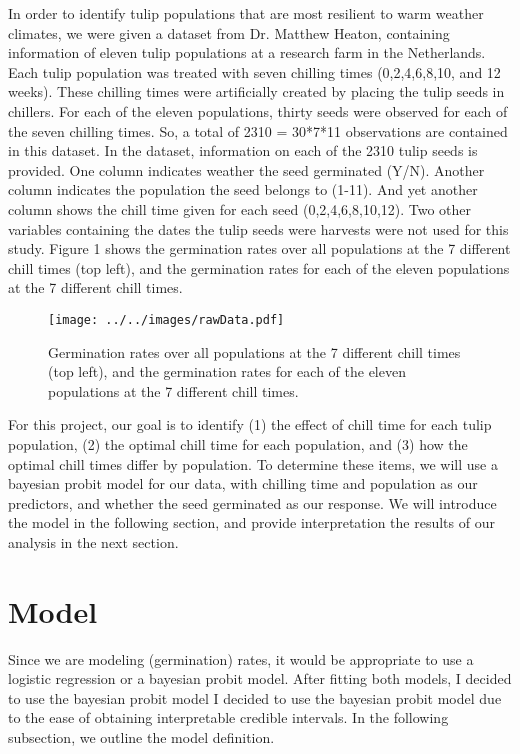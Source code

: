 \documentclass[mathserif]{article}
\def\beginmyfig{\begin{figure}[htbp]\begin{center}}
\def\endmyfig{\end{center}\end{figure}}
\begin{document}
\noindent
In order to identify tulip populations that are most resilient to warm weather
climates, we were given a dataset from Dr. Matthew Heaton, containing
information of eleven tulip populations at a research farm in the Netherlands.
Each tulip population was treated with seven chilling times (0,2,4,6,8,10, and
12 weeks). These chilling times were artificially created by placing the tulip
seeds in chillers. For each of the eleven populations, thirty seeds were
observed for each of the seven chilling times. So, a total of 2310 = 30*7*11
observations are contained in this dataset. In the dataset, information on each
of the 2310 tulip seeds is provided. One column indicates weather the seed
germinated (Y/N). Another column indicates the population the seed belongs to
(1-11). And yet another column shows the chill time given for each seed
(0,2,4,6,8,10,12). Two other variables containing the dates the tulip seeds
were harvests were not used for this study. Figure 1 shows the germination
rates over all populations at the 7 different chill times (top left), and
the germination rates for each of the eleven populations at the 7 different
chill times.\\
\beginmyfig
    \texttt{[image: ../../images/rawData.pdf]}
    \caption{Germination rates over all populations at the 7 different
             chill times (top left), and the germination rates for each of 
             the eleven populations at the 7 different chill times.}
\endmyfig

\noindent
For this project, our goal is to identify (1) the effect of chill time for each
tulip population, (2) the optimal chill time for each population, and (3) how
the optimal chill times differ by population. To determine these items, we will
use a bayesian probit model for our data, with chilling time and population as
our predictors, and whether the seed germinated as our response. We will
introduce the model in the following section, and provide interpretation the
results of our analysis in the next section.\\

\section*{Model}
Since we are modeling (germination) rates, it would be appropriate to use a
logistic regression or a bayesian probit model. After fitting both models, I
decided to use the bayesian probit model I decided to use the bayesian probit
model due to the ease of obtaining interpretable credible intervals. In the 
following subsection, we outline the model definition.\\
\end{document}
